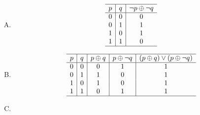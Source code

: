 {{\begin{practices}
\begin{enumerate}[A.]
{\begin{table}[H]
\[\begin{array}{c|c|c}
                                \hline
                            \end{array}
                        \]
                    \end{table}
                }
                \item 
                {
                    \begin{table}[H]
                        \[
                            \begin{array}{c|c|c}
                                \hline
                                p & q & \neg p \oplus \neg q \\
                                \hline
                                0 & 0 & 0 \\
                                0 & 1 & 1 \\
                                1 & 0 & 1 \\
                                1 & 1 & 0 \\
                                \hline
                            \end{array}
                        \]
                    \end{table}
                }
                \item
                {
                    \begin{table}[H]
                        \[
                            \begin{array}{c|c|c|c|c}
                                \hline
                                p & q & p \oplus q & p \oplus \neg q & (p \oplus q) \vee (p \oplus \neg q) \\
                                \hline
                                0 & 0 & 0 & 1 & 1 \\
                                0 & 1 & 1 & 0 & 1 \\
                                1 & 0 & 1 & 0 & 1 \\
                                1 & 1 & 0 & 1 & 1 \\
                                \hline
                            \end{array}
                        \]
                    \end{table}
                }
                \item
                {
                    \begin{table}[H]
                        \[
                            \begin{array}{c|c|c|c|c}

\end{array}\]
\end{table}}
\end{enumerate}
\end{practices}}}
